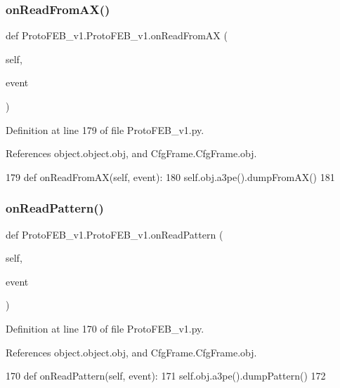 \subsubsection{\texorpdfstring{on\+Read\+From\+A\+X()}{onReadFromAX()}}
{\footnotesize\ttfamily def Proto\+F\+E\+B\+\_\+v1.\+Proto\+F\+E\+B\+\_\+v1.\+on\+Read\+From\+AX (\begin{DoxyParamCaption}\item[{}]{self,  }\item[{}]{event }\end{DoxyParamCaption})}



Definition at line 179 of file Proto\+F\+E\+B\+\_\+v1.\+py.



References object.\+object.\+obj, and Cfg\+Frame.\+Cfg\+Frame.\+obj.


\begin{DoxyCode}
179     \textcolor{keyword}{def }onReadFromAX(self, event):
180         self.obj.a3pe().dumpFromAX()
181 
\end{DoxyCode}
\mbox{\label{classProtoFEB__v1_1_1ProtoFEB__v1_ac3b7f23ff35c3ea4ca38782468b96d1e}} 
\subsubsection{\texorpdfstring{on\+Read\+Pattern()}{onReadPattern()}}
{\footnotesize\ttfamily def Proto\+F\+E\+B\+\_\+v1.\+Proto\+F\+E\+B\+\_\+v1.\+on\+Read\+Pattern (\begin{DoxyParamCaption}\item[{}]{self,  }\item[{}]{event }\end{DoxyParamCaption})}



Definition at line 170 of file Proto\+F\+E\+B\+\_\+v1.\+py.



References object.\+object.\+obj, and Cfg\+Frame.\+Cfg\+Frame.\+obj.


\begin{DoxyCode}
170     \textcolor{keyword}{def }onReadPattern(self, event):
171         self.obj.a3pe().dumpPattern()
172 
\end{DoxyCode}
\mbox{\label{classProtoFEB__v1_1_1ProtoFEB__v1_ad6c45326229443ae2b784b92eab27c60}} 

